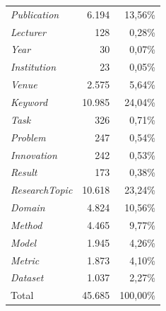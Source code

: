 \begin{enumerate}[label=(\alph*), leftmargin=*, itemsep=10pt]
\begin{longtable}{@{}lrr@{}}
              \textit{Publication}   & 6.194  & 13,56\%                                                        \\
              \textit{Lecturer}      & 128    & 0,28\%                                                         \\
              \textit{Year}          & 30     & 0,07\%                                                         \\
              \textit{Institution}   & 23     & 0,05\%                                                         \\
              \textit{Venue}         & 2.575  & 5,64\%                                                         \\
              \textit{Keyword}       & 10.985 & 24,04\%                                                        \\
              \textit{Task}          & 326    & 0,71\%                                                         \\
              \textit{Problem}       & 247    & 0,54\%                                                         \\
              \textit{Innovation}    & 242    & 0,53\%                                                         \\
              \textit{Result}        & 173    & 0,38\%                                                         \\
              \textit{ResearchTopic} & 10.618 & 23,24\%                                                        \\
              \textit{Domain}        & 4.824  & 10,56\%                                                        \\
              \textit{Method}        & 4.465  & 9,77\%                                                         \\
              \textit{Model}         & 1.945  & 4,26\%                                                         \\
              \textit{Metric}        & 1.873  & 4,10\%                                                         \\
              \textit{Dataset}       & 1.037  & 2,27\%                                                         \\
              \midrule
              Total                  & 45.685 & 100,00\%                                                       \\
              \bottomrule
          \end{longtable}
          \endgroup


\end{enumerate}
